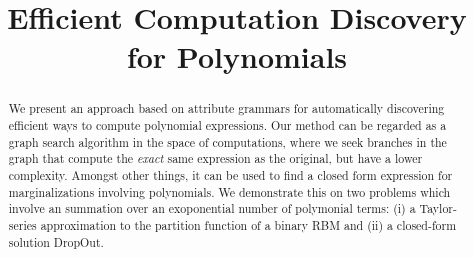\documentclass[]{article}
\title{Efficient Computation Discovery for Polynomials}
\numberwithin{equation}{section}
\begin{document}
 

\maketitle





 

\begin{abstract} We present an approach based on attribute grammars
  for automatically discovering efficient ways to compute polynomial
  expressions. Our method can be regarded as
  a graph search algorithm in the space of computations, where we seek
  branches in the graph that compute the {\em exact} same expression as
  the original, but have a lower complexity. Amongst other things, it can be used
  to find a closed form expression for marginalizations involving
  polynomials. We demonstrate this on two problems which involve an
  summation over an exoponential number of polymonial terms: (i) a
  Taylor-series approximation to the partition function of a binary
  RBM and (ii) a closed-form solution DropOut. 
 \end{abstract} 










\nocite{*}


\end{document}
